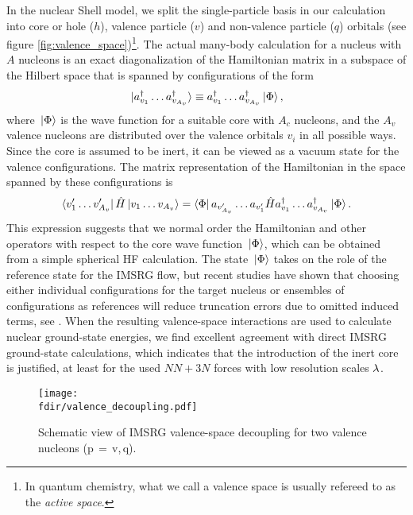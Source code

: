 In the nuclear Shell model, we split the single-particle basis in our 
calculation into core or hole ($h$), valence particle ($v$) and non-valence 
particle ($q$) orbitals (see figure \ref{fig:valence_space})\footnote{In
quantum chemistry, what we call a valence space is usually refereed to as
the \emph{active space}.}. The actual many-body calculation for a nucleus
with $A$ nucleons is an exact diagonalization of the Hamiltonian matrix in a 
subspace of the Hilbert space that is spanned by configurations 
of the form
\begin{equation}\label{eq:def_configurations}
  \ket{\aaO_{v_1}\ldots\aaO_{v_{A_v}}} \equiv \aaO_{v_1}\ldots\aaO_{v_{A_v}}\ket{\Phi}\,,
\end{equation}
where $\,|{\Phi}\rangle$ is the wave function for a suitable core with $A_c$
nucleons, and the $A_v$ valence nucleons are distributed over the valence
orbitals $v_i$ in all possible ways. Since the core is assumed to be inert, 
it can be viewed as a vacuum state for the valence configurations. The matrix 
representation of the Hamiltonian in the space spanned by these configurations 
is
\begin{equation}
  \langle{v'_{1}\ldots v'_{A_v}}|\,{\hat{H}}\,|{v_{1}\ldots v_{A_v}}\rangle
  = \langle{\Phi}|\,{a_{v'_{A_v}}\ldots a_{v'_1}\hat{H}a^\dag_{v_1}\ldots a^\dag_{v_{A_v}}}\,|{\Phi}\rangle\,.
\end{equation}
This expression suggests that we normal order the Hamiltonian and other 
operators with respect to the core wave function $\,|{\Phi}\rangle$, which can
be obtained from a simple spherical HF calculation. The state $\,|{\Phi}\rangle$
takes on the role of the reference state for the IMSRG flow, but recent
studies have shown that choosing either individual configurations for the 
target nucleus or ensembles of configurations as references will reduce 
truncation errors due to omitted induced terms, see 
\cite{Stroberg:2016fk,Stroberg:2016th}. When the resulting valence-space
interactions are used to calculate nuclear ground-state energies, we find
excellent agreement with direct IMSRG ground-state calculations, which 
indicates that the introduction of the inert core is justified, at least
for the used $NN+3N$ forces with low resolution scales $\lambda$.

\begin{figure}[t]
  \begin{center}
    \texttt{[image: \\fdir/valence\_decoupling.pdf]}
  \end{center}
  \caption{\label{fig:valence_decoupling}
    Schematic view of IMSRG valence-space decoupling for two valence nucleons (p$\,=\,$v,\,q).
  }
\end{figure}


